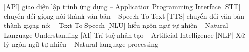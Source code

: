  [API]   {giao diện lập trình ứng dụng -- Application Programming Interface}
 [STT]   {chuyển đổi giọng nói thành văn bản -- Speech To Text}
 [TTS]   {chuyển đổi văn bản thành giọng nói -- Text To Speech}
 [NLU]   {hiểu ngôn ngữ tự nhiên -- Natural Language Understanding}
  [AI]    {Trí tuệ nhân tạo -- Artificial Intelligence}
 [NLP]    {Xử lý ngôn ngữ tự nhiên -- Natural language processing}